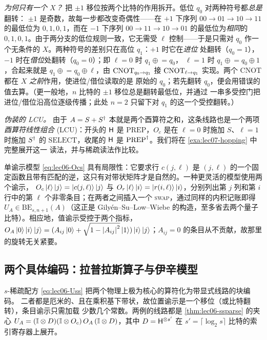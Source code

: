 \begin{example}
\emph{为何只有一个 $X$？} 把 $\pm1$ 移位按两个比特的作用拆开。低位 $q_0$ 对两种符号都\emph{总是}翻转：
$\pm1$ 是奇数，故每一步都改变奇偶性——在 $+1$ 下序列 $00\to01\to10\to11$ 的最低位为 $0,1,0,1$，而在
$-1$ 下序列 $00\to11\to10\to01$ 的最低位为\emph{相同}的 $0,1,0,1$。由于两分支的低位规则一致，它无需受
$\ell$ 控制——于是只需对 $q_0$ 作一个无条件的 $X$。两种符号的差别只在高位 $q_1$：$+1$ 时它在\emph{进位}
处翻转（$q_0{=}1$），$-1$ 时在\emph{借位}处翻转（$q_0{=}0$）；即 $\ell{=}0$ 时 $q_1\mathrel{\oplus}=q_0$，
$\ell{=}1$ 时 $q_1\mathrel{\oplus}=q_0\oplus1$，合起来就是 $q_1\mathrel{\oplus}=q_0\oplus\ell$，由
$\mathrm{CNOT}_{q_0\to q_1}$ 接 $\mathrm{CNOT}_{\ell\to q_1}$ 实现。两个 CNOT 都在 $X$ \emph{之前}作用，使进位/借位读取的是
原始的 $q_0$；若先翻转 $q_0$，便会用错误的值去算。（更一般地，$n$ 比特的 $\pm1$ 移位总是翻转最低位，并通过
一串多受控门把进位/借位沿高位逐级传播；此处 $n=2$ 只留下对 $q_1$ 的这一个受控翻转。）

\emph{伪装的 LCU。} 由于 $A=S+S^{\dagger}$ 本就是两个酉算符之和，这条线路也是一个两项\emph{酉算符线性组合}
(LCU)：开头的 $\mathsf{H}$ 是 $\mathrm{PREP}$，$O_c$ 是在 $\ell{=}0$ 时施加 $S$、$\ell{=}1$ 时施加 $S^{\dagger}$ 的
$\mathrm{SELECT}$，收尾的 $\mathsf{H}$ 是 $\mathrm{PREP}^{\dagger}$。我们将在 \cref{exa:lec07-hopping} 中完整展开这一
读法，并与稀疏读法作比较。
\end{example}

\begin{remark}[更一般的位置谕示]
\label{rem:lec06-genloc}
单谕示模型 \eqref{eq:lec06-Ocs} 具有局限性：它要求行
$c(j,\ell)$ 是 $(j,\ell)$ 的一个固定函数且带有匹配的逆，这只有对带状矩阵才是自然的。一种更灵活的模型使用两个谕示，
$O_c\ket{\ell}\ket{j}=\ket{c(j,\ell)}\ket{j}$ 与
$O_r\ket{\ell}\ket{i}=\ket{r(i,\ell)}\ket{i}$，分别列出第 $j$ 列和第 $i$ 行中的第 $\ell$ 个非零条目；在两者之间插入一个 \textsc{swap}，通过同样的内积记账即得
$U_A\in\mathrm{BE}_{s,n+1}(A)$（这正是 Gily\'en--Su--Low--Wiebe 的构造，至多省去两个量子比特）。相应地，值谕示受控于两个指标，
$O_A\ket{0}\ket{i}\ket{j}=(A_{ij}\ket{0}+\sqrt{1-\left\lvert A_{ij} \right\rvert^2}\ket{1})\ket{i}
\ket{j}$；$A_{ij}=0$ 的条目从不贡献，故那里的旋转无关紧要。
\end{remark}

\subsection*{两个具体编码：拉普拉斯算子与伊辛模型}

$s$-稀疏配方 \eqref{eq:lec06-Uss} 把两个物理上极为核心的算符化为带显式线路的块编码。
二者都是厄米的、且在乘积基下带状，故位置谕示是一个移位（或比特翻转），条目谕示只需加载
少数几个常数。两例的线路都是 \cref{thm:lec06-ssparse} 的夹心
$U_A=(\mathbb{I}\otimes D)(\mathbb{I}\otimes O_c)\,O_A\,(\mathbb{I}\otimes D)$，其中 $D=\mathsf{H}^{\otimes s'}$
在 $s'=\lceil\log_2 s\rceil$ 比特的索引寄存器上展开。

